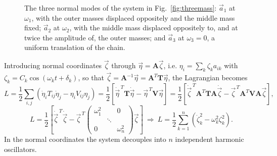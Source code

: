 \documentclass[11pt]{article}
\newcommand{\bT}{\mathbf{T}}
\newcommand{\bV}{\mathbf{V}}
\newcommand{\bA}{\mathbf{A}}
\begin{document}
\begin{figure}[htb]
\centering
{}
\caption{The three normal modes of the system in Fig.~\ref{fig:threemass}: $\vec a_1$ at $\omega_1$, with the outer masses displaced oppositely and the middle mass fixed; $\vec a_2$ at $\omega_2$, with the middle mass displaced oppositely to, and at twice the amplitude of, the outer masses; and $\vec a_3$ at $\omega_3=0$, a uniform translation of the chain.}
\label{fig:threemodes}
\end{figure}

Introducing normal coordinates $\vec\zeta$ through $\vec\eta = \bA\vec\zeta$, i.e. $\eta_i = \sum_k \zeta_k a_{ik}$ with $\zeta_k = C_k\cos(\omega_k t+\delta_k)$, so that $\vec\zeta = \bA^{-1}\vec\eta = \bA^{T}\bT\vec\eta$, the Lagrangian becomes
\begin{equation}
L = \frac12\sum_{i,j}\left(\dot\eta_i T_{ij}\dot\eta_j - \eta_i V_{ij}\eta_j\right) = \frac12\left[\dot{\vec\eta}^{\,T}\bT\dot{\vec\eta}-\vec\eta^{\,T}\bV\vec\eta\right] = \frac12\left[\dot{\vec\zeta}^{\,T}\bA^{T}\bT\bA\dot{\vec\zeta}-\vec\zeta^{\,T}\bA^{T}\bV\bA\vec\zeta\right],
\end{equation}
\begin{equation}
L = \frac12\left[\dot{\vec\zeta}^{\,T}\dot{\vec\zeta}-\vec\zeta^{\,T}\begin{pmatrix}\omega_1^2 & &0\\ &\ddots& \\0& &\omega_n^2\end{pmatrix}\vec\zeta\right] \ \Longrightarrow\ \boxed{L = \frac12\sum_{k=1}^n\left(\dot\zeta_k^2-\omega_k^2\zeta_k^2\right).}
\end{equation}
In the normal coordinates the system decouples into $n$ independent harmonic oscillators.
\end{document}
